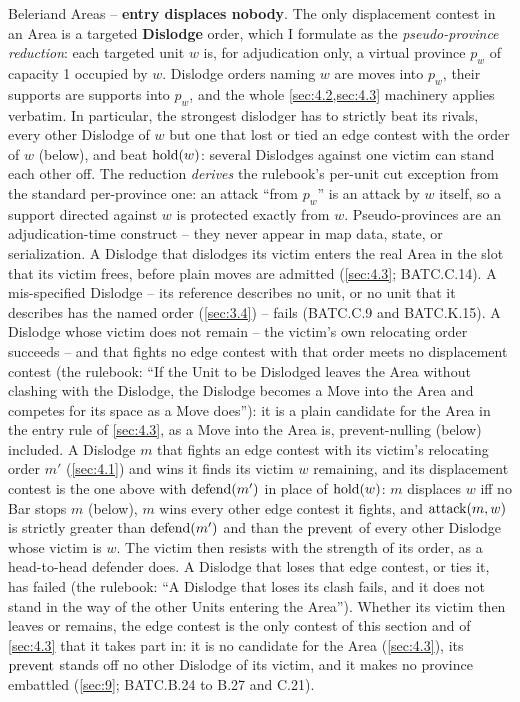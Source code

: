 \documentclass[12pt,a4paper]{article}
\begin{document}
Beleriand Areas -- \textbf{entry displaces nobody}.
The only displacement contest in an Area is a targeted \textbf{Dislodge} order, which I formulate as the \emph{pseudo-province reduction}: each targeted unit $w$ is, for adjudication only, a virtual province $p_w$ of capacity 1 occupied by $w$.
Dislodge orders naming $w$ are moves into $p_w$, their supports are supports into $p_w$, and the whole \cref{sec:4.2,sec:4.3} machinery applies verbatim.
In particular, the strongest dislodger has to strictly beat its rivals, every other Dislodge of $w$ but one that lost or tied an edge contest with the order of $w$ (below), and beat $\operatorname{hold}(w)$: several Dislodges against one victim can stand each other off.
The reduction \emph{derives} the rulebook's per-unit cut exception from the standard per-province one: an attack ``from $p_w$'' is an attack by $w$ itself, so a support directed against $w$ is protected exactly from $w$.
Pseudo-provinces are an adjudication-time construct -- they never appear in map data, state, or serialization.
A Dislodge that dislodges its victim enters the real Area in the slot that its victim frees, before plain moves are admitted (\cref{sec:4.3}; BATC.C.14).
A mis-specified Dislodge -- its reference describes no unit, or no unit that it describes has the named order (\cref{sec:3.4}) -- fails (BATC.C.9 and BATC.K.15).
A Dislodge whose victim does not remain -- the victim's own relocating order succeeds -- and that fights no edge contest with that order meets no displacement contest (the rulebook: ``If the Unit to be Dislodged leaves the Area without clashing with the Dislodge, the Dislodge becomes a Move into the Area and competes for its space as a Move does''): it is a plain candidate for the Area in the entry rule of \cref{sec:4.3}, as a Move into the Area is, prevent-nulling (below) included.
A Dislodge $m$ that fights an edge contest with its victim's relocating order $m'$ (\cref{sec:4.1}) and wins it finds its victim $w$ remaining, and its displacement contest is the one above with $\operatorname{defend}(m')$ in place of $\operatorname{hold}(w)$: $m$ displaces $w$ iff no Bar stops $m$ (below), $m$ wins every other edge contest it fights, and $\operatorname{attack}(m, w)$ is strictly greater than $\operatorname{defend}(m')$ and than the $\operatorname{prevent}$ of every other Dislodge whose victim is $w$.
The victim then resists with the strength of its order, as a head-to-head defender does.
A Dislodge that loses that edge contest, or ties it, has failed (the rulebook: ``A Dislodge that loses its clash fails, and it does not stand in the way of the other Units entering the Area'').
Whether its victim then leaves or remains, the edge contest is the only contest of this section and of \cref{sec:4.3} that it takes part in: it is no candidate for the Area (\cref{sec:4.3}), its $\operatorname{prevent}$ stands off no other Dislodge of its victim, and it makes no province embattled (\cref{sec:9}; BATC.B.24 to B.27 and C.21).
\end{document}
